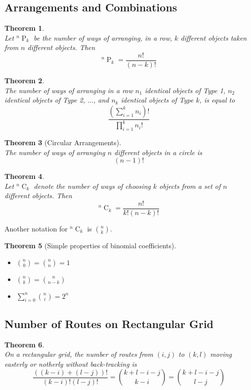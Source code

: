 \documentclass[12pt]{article}
\newtheorem{theorem}{Theorem}[section]
\theoremstyle{definition}
\DeclareMathOperator{\perm}{P}
\DeclareMathOperator{\combi}{C}
\begin{document}
\subsection{Arrangements and Combinations}
\begin{theorem}
\hfill\\\normalfont Let $^n\perm_k$ be the number of ways of arranging, in a row, $k$ \textit{different} objects taken from $n$ \textit{different} objects. Then
\[
^n\perm_k = \frac{n!}{(n-k)!}
\]
\end{theorem}
\begin{theorem}
\hfill\\\normalfont The number of ways of arranging in a row $n_1$ \textit{identical} objects of Type 1, $n_2$ identical objects of Type 2, $\ldots$, and $n_k$ identical objects of Type $k$, is equal to
\[
\frac{(\sum_{i=1}^kn_i)!}{\prod_{i=1}^kn_i!}
\]
\end{theorem}
\begin{theorem}[Circular Arrangements]
\hfill\\\normalfont The number of ways of arranging $n$ different objects in a circle is
\[
(n-1)!
\]
\end{theorem}
\begin{theorem}
\hfill\\\normalfont Let $^n\combi_k$ denote the number of ways of choosing $k$ objects from a set of $n$ different objects. Then
\[
^n\combi_k = \frac{n!}{k!(n-k)!}
\]
\end{theorem}
Another notation for $^n\combi_k$ is $\binom{n}{k}$.
\begin{theorem}[Simple properties of binomial coefficients]
\hfill\\\normalfont
\begin{itemize}
  \item $\binom{n}{0}=\binom{n}{n}=1$
  \item $\binom{n}{k}=\binom{n}{n-k}$
  \item $\sum_{i = 0}^n\binom{n}{i}=2^n$
\end{itemize}
\end{theorem}
\subsection{Number of Routes on Rectangular Grid}
\begin{theorem}\hfill\\\normalfont On a rectangular grid, the number of routes from $(i,j)$ to $(k,l)$ moving easterly or notherly without back-tracking is
\[
\frac{((k-i)+(l-j))!}{(k-i)!(l-j)!}=\binom{k+l-i-j}{k-i}=\binom{k+l-i-j}{l-j}
\]
\end{theorem}
\end{document}

